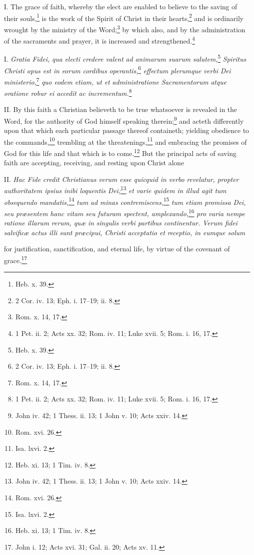 
I. The grace of faith, whereby the elect are enabled to believe to the saving of their souls,\footnote{Heb. x. 39.} is the work of the Spirit of Christ in their hearts,\footnote{2 Cor. iv. 13; Eph. i. 17–19; ii. 8.} and is ordinarily wrought by the ministry of the Word;\footnote{Rom. x. 14, 17.} by which also, and by the administration of the sacraments and prayer, it is increased and strengthened.\footnote{1 Pet. ii. 2; Acts xx. 32; Rom. iv. 11; Luke xvii. 5; Rom. i. 16, 17.}

I. \emph{Gratia Fidei, qua electi credere valent ad animarum suarum salutem,}\footnote{Heb. x. 39.}\emph{ Spiritus Christi opus est in eorum cordibus operantis,}\footnote{2 Cor. iv. 13; Eph. i. 17–19; ii. 8.}\emph{ effectum plerumque verbi Dei ministerio,}\footnote{Rom. x. 14, 17.}\emph{ quo eodem etiam, ut et administratione Sacramentorum atque oratione robur ei accedit ac incrementum.}\footnote{1 Pet. ii. 2; Acts xx. 32; Rom. iv. 11; Luke xvii. 5; Rom. i. 16, 17.}

II. By this faith a Christian believeth to be true whatsoever is revealed in the Word, for the authority of God himself speaking therein;\footnote{John iv. 42; 1 Thess. ii. 13; 1 John v. 10; Acts xxiv. 14.} and acteth differently upon that which each particular passage thereof containeth; yielding obedience to the commands,\footnote{Rom. xvi. 26.} trembling at the threatenings,\footnote{Isa. lxvi. 2.} and embracing the promises of God for this life and that which is to come.\footnote{Heb. xi. 13; 1 Tim. iv. 8.} But the principal acts of saving faith are accepting, receiving, and resting upon Christ alone

II. \emph{Hac Fide credit Christianus verum esse quicquid in verbo revelatur, propter authoritatem ipsius inibi loquentis Dei;}\footnote{John iv. 42; 1 Thess. ii. 13; 1 John v. 10; Acts xxiv. 14.}\emph{ et varie quidem in illud agit tum obsequendo mandatis,}\footnote{Rom. xvi. 26.}\emph{ tum ad minas contremiscens,}\footnote{Isa. lxvi. 2.}\emph{ tum etiam promissa Dei, seu præsentem hanc vitam seu futuram spectent, amplexando,}\footnote{Heb. xi. 13; 1 Tim. iv. 8.}\emph{ pro varia nempe ratione illarum rerum, quæ in singulis verbi partibus continentur. Verum fidei salvificæ actus illi sunt præcipui, Christi acceptatio et receptio, in eumque solum }

for justification, sanctification, and eternal life, by virtue of the covenant of grace.\footnote{John i. 12; Acts xvi. 31; Gal. ii. 20; Acts xv. 11.}

